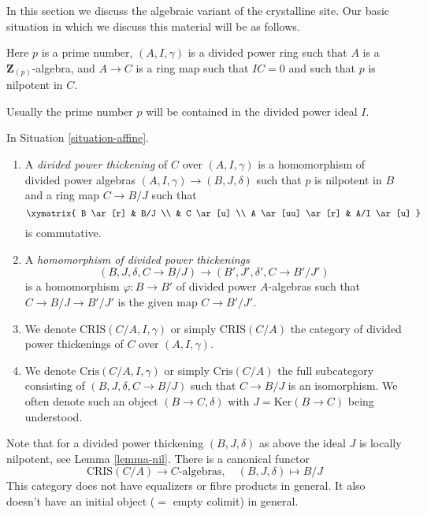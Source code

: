 \noindent
In this section we discuss the algebraic variant of the crystalline site.
Our basic situation in which we discuss this material will be as
follows.

\begin{situation}
\label{situation-affine}
Here $p$ is a prime number, $(A, I, \gamma)$ is a divided power
ring such that $A$ is a $\mathbf{Z}_{(p)}$-algebra, and $A \to C$ is a
ring map such that $IC = 0$ and such that $p$ is nilpotent in $C$.
\end{situation}

\noindent
Usually the prime number $p$ will be contained in the
divided power ideal $I$.

\begin{definition}
\label{definition-affine-thickening}
In Situation \ref{situation-affine}.
\begin{enumerate}
\item A {\it divided power thickening} of $C$ over $(A, I, \gamma)$
is a homomorphism of divided power algebras $(A, I, \gamma) \to (B, J, \delta)$
such that $p$ is nilpotent in $B$ and a ring map $C \to B/J$ such that
$$
\xymatrix{
B \ar[r] & B/J \\
& C \ar[u] \\
A \ar[uu] \ar[r] & A/I \ar[u]
}
$$
is commutative.
\item A {\it homomorphism of divided power thickenings}
$$
(B, J, \delta, C \to B/J) \longrightarrow (B', J', \delta', C \to B'/J')
$$
is a homomorphism $\varphi : B \to B'$ of divided power $A$-algebras such
that $C \to B/J \to B'/J'$ is the given map $C \to B'/J'$.
\item We denote $\text{CRIS}(C/A, I, \gamma)$ or simply $\text{CRIS}(C/A)$
the category of divided power thickenings of $C$ over $(A, I, \gamma)$.
\item We denote $\text{Cris}(C/A, I, \gamma)$ or simply $\text{Cris}(C/A)$
the full subcategory consisting of $(B, J, \delta, C \to B/J)$ such that
$C \to B/J$ is an isomorphism. We often denote such an object
$(B \to C, \delta)$ with $J = \text{Ker}(B \to C)$ being understood.
\end{enumerate}
\end{definition}

\noindent
Note that for a divided power thickening $(B, J, \delta)$ as above
the ideal $J$ is locally nilpotent, see Lemma \ref{lemma-nil}.
There is a canonical functor
\begin{equation}
\label{equation-forget-affine}
\text{CRIS}(C/A) \longrightarrow C\text{-algebras},\quad
(B, J, \delta) \longmapsto B/J
\end{equation}
This category does not have equalizers or fibre products in general.
It also doesn't have an initial object ($=$ empty colimit) in general.

